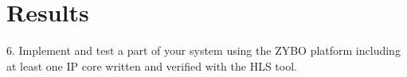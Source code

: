 \section{Results}

\begin{framed}
6. Implement and test a part of your system using the ZYBO platform including at least one IP core written and verified with the HLS tool.
\end{framed}